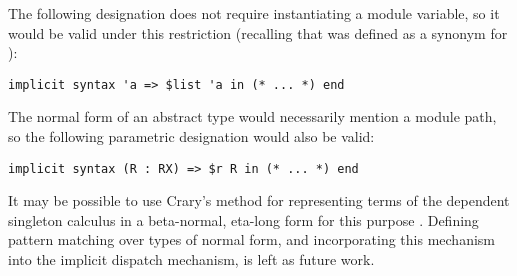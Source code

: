 The following designation does not require instantiating a module variable, so it would be valid under this restriction (recalling that  was defined as a synonym for ):
\begin{lstlisting}[numbers=none]
implicit syntax 'a => $list 'a in (* ... *) end
\end{lstlisting}

The normal form of an abstract type would necessarily mention a module path, so the following parametric designation would also be valid:
\begin{lstlisting}[numbers=none]
implicit syntax (R : RX) => $r R in (* ... *) end 
\end{lstlisting}

It may be possible to use Crary's method for representing terms of the dependent singleton calculus in a beta-normal, eta-long form for this purpose \cite{DBLP:conf/lfmtp/Crary09}. Defining pattern matching over types of normal form, and incorporating this mechanism into the implicit dispatch mechanism, is left as future work.




